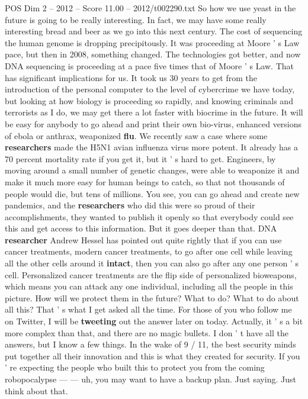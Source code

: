 \begin{textsample}{POS Dim 2 – 2012 – Score 11.00 – 2012/t002290.txt}
So how we use yeast in the future is going to be really interesting.
In fact, we may have some really interesting bread and beer as we go into this next century.
The cost of sequencing the human genome is dropping precipitously.
It was proceeding at Moore ' s Law pace, but then in 2008, something changed.
The technologies got better, and now DNA sequencing is proceeding at a pace five times that of Moore ' s Law.
That has significant implications for us.
It took us 30 years to get from the introduction of the personal computer to the level of cybercrime we have today, but looking at how biology is proceeding so rapidly, and knowing criminals and terrorists as I do, we may get there a lot faster with biocrime in the future.
It will be easy for anybody to go ahead and print their own bio-virus, enhanced versions of ebola or anthrax, weaponized \textbf{flu}.
We recently saw a case where some \textbf{researchers} made the H5N1 avian influenza virus more potent.
It already has a 70 percent mortality rate if you get it, but it ' s hard to get.
Engineers, by moving around a small number of genetic changes, were able to weaponize it and make it much more easy for human beings to catch, so that not thousands of people would die, but tens of millions.
You see, you can go ahead and create new pandemics, and the \textbf{researchers} who did this were so proud of their accomplishments, they wanted to publish it openly so that everybody could see this and get access to this information.
But it goes deeper than that.
DNA \textbf{researcher} Andrew Hessel has pointed out quite rightly that if you can use cancer treatments, modern cancer treatments, to go after one cell while leaving all the other cells around it \textbf{intact}, then you can also go after any one person ' s cell.
Personalized cancer treatments are the flip side of personalized bioweapons, which means you can attack any one individual, including all the people in this picture.
How will we protect them in the future?
What to do?
What to do about all this?
That ' s what I get asked all the time.
For those of you who follow me on Twitter, I will be \textbf{tweeting} out the answer later on today.
Actually, it ' s a bit more complex than that, and there are no magic bullets.
I don ' t have all the answers, but I know a few things.
In the wake of 9 / 11, the best security minds put together all their innovation and this is what they created for security.
If you ' re expecting the people who built this to protect you from the coming robopocalypse — — uh, you may want to have a backup plan.
Just saying.
Just think about that.

\end{textsample}
